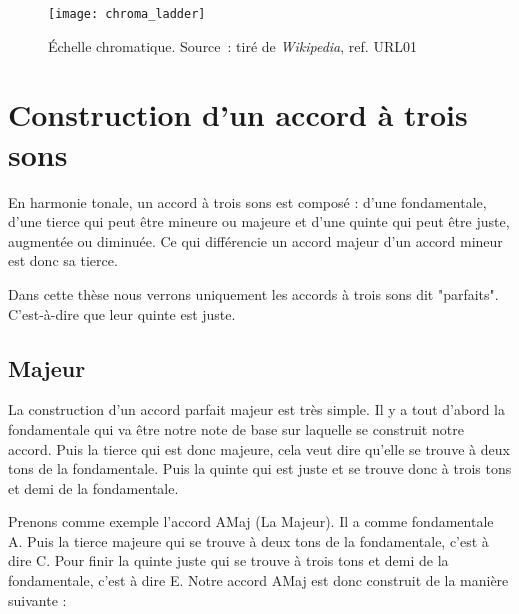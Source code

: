 \begin{figure}[H]
	\centering
	\texttt{[image: chroma\_ladder]}
	\caption[Échelle chromatique]{Échelle chromatique. Source : tiré de \textit{Wikipedia}, ref. URL01}
	\label{fig:chroma_ladder}
\end{figure}

\section{Construction d'un accord à trois sons}
\label{sec:2.3}

En harmonie tonale, un accord à trois sons est composé : d'une fondamentale, d'une tierce qui peut être mineure ou majeure et d'une quinte qui peut être juste, augmentée ou diminuée. Ce qui différencie un accord majeur d'un accord mineur est donc sa tierce.

Dans cette thèse nous verrons uniquement les accords à trois sons dit "parfaits". C'est-à-dire que leur quinte est juste.

\subsection{Majeur}
La construction d'un accord parfait majeur est très simple. Il y a tout d'abord la fondamentale qui va être notre note de base sur laquelle se construit notre accord. Puis la tierce qui est donc majeure, cela veut dire qu'elle se trouve à deux tons de la fondamentale. Puis la quinte qui est juste et se trouve donc à trois tons et demi de la fondamentale.

Prenons comme exemple l'accord AMaj (La Majeur). Il a comme fondamentale A. Puis la tierce majeure qui se trouve à deux tons de la fondamentale, c'est à dire C\sh. Pour finir la quinte juste qui se trouve à trois tons et demi de la fondamentale, c'est à dire E. Notre accord AMaj est donc construit de la manière suivante :

\begin{table}[H]
\end{table}

